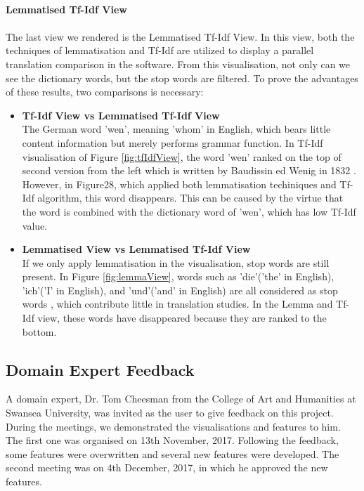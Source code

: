 \paragraph{Lemmatised Tf-Idf View}
\paragraph[]{} The last view we rendered is the Lemmatised Tf-Idf View. In this view, both the techniques of lemmatisation and Tf-Idf are utilized to display a parallel translation comparison in the software. From this visualisation, not only can we see the dictionary words, but the stop words are filtered. To prove the advantages of these results, two comparisons is necessary:
\begin{itemize} 	
	\item \textbf{Tf-Idf View vs Lemmatised Tf-Idf View}\\
    The German word 'wen', meaning 'whom' in English, which bears little content information but merely performs grammar function. In Tf-Idf visualisation of Figure \ref{fig:tfIdfView}, the word 'wen' ranked on the top of second version from the left which is written by Baudissin ed Wenig in 1832 \cite{Hotho2005}. However, in Figure28, which applied both lemmatisation techiniques and Tf-Idf algorithm, this word disappears. This can be caused by the virtue that the word is combined with the dictionary word of 'wen', which has low Tf-Idf value.
	\item \textbf{Lemmatised View vs Lemmatised Tf-Idf View}\\
If we only apply lemmatisation in the visualisation, stop words are still present. In Figure \ref{fig:lemmaView}, words such as 'die'('the' in English), 'ich'('I' in English), and 'und'('and' in English) are all considered as stop words \cite{Hotho2005}, which contribute little in translation studies. In the Lemma and Tf-Idf view, these words have disappeared because they are ranked to the bottom. 
\end{itemize}

\subsection{Domain Expert Feedback}

A domain expert, Dr. Tom Cheesman from the College of Art and Humanities at Swansea University, was invited as the user to give feedback on this project. During the meetings, we demonstrated the visualisations and features to him. The first one was organised on 13th November, 2017. Following the feedback, some features were overwritten and several new features were developed. The second meeting was on 4th December, 2017, in which he approved the new features.

